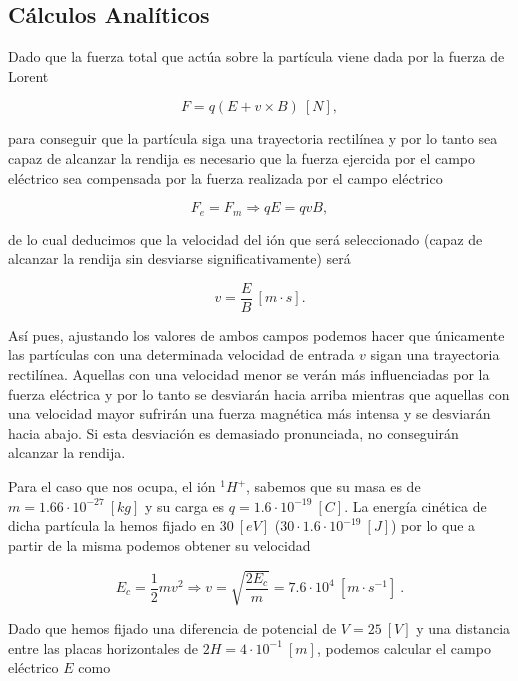 \documentclass[journal]{IEEEtran}
\begin{document}
\subsection{Cálculos Analíticos}

Dado que la fuerza total que actúa sobre la partícula viene dada por la fuerza de Lorent

\begin{equation}
    F = q(E + v \times B)~[N],
\end{equation}

para conseguir que la partícula siga una trayectoria rectilínea y por lo tanto sea capaz de alcanzar la rendija es necesario que la fuerza ejercida por el campo eléctrico sea compensada por la fuerza realizada por el campo eléctrico

\begin{equation}
    F_e = F_m \Rightarrow qE = qvB,
\end{equation}

de lo cual deducimos que la velocidad del ión que será seleccionado (capaz de alcanzar la rendija sin desviarse significativamente) será

\begin{equation}
    v = \displaystyle\frac{E}{B}~[m\cdot s].
\end{equation}

Así pues, ajustando los valores de ambos campos podemos hacer que únicamente las partículas con una determinada velocidad de entrada $v$ sigan una trayectoria rectilínea. Aquellas con una velocidad menor se verán más influenciadas por la fuerza eléctrica y por lo tanto se desviarán hacia arriba mientras que aquellas con una velocidad mayor sufrirán una fuerza magnética más intensa y se desviarán hacia abajo. Si esta desviación es demasiado pronunciada, no conseguirán alcanzar la rendija.

Para el caso que nos ocupa, el ión $^1H^+$, sabemos que su masa es de $m = 1.66\cdot 10^{-27}~[kg]$ y su carga es $q = 1.6 \cdot 10^{-19}~[C]$. La energía cinética de dicha partícula la hemos fijado en $30~[eV]$ ($30\cdot 1.6\cdot 10^{-19}~[J]$) por lo que a partir de la misma podemos obtener su velocidad

\begin{equation}
    E_c = \displaystyle\frac{1}{2}mv^2 \Rightarrow v = \sqrt{\displaystyle\frac{2E_c}{m}} = 7.6\cdot 10^4~[m\cdot s^{-1}]~.
\end{equation}

Dado que hemos fijado una diferencia de potencial de $V = 25~[V]$ y una distancia entre las placas horizontales de $2H = 4\cdot 10^{-1}~[m]$, podemos calcular el campo eléctrico $E$ como
\end{document}
